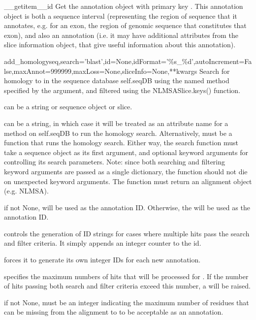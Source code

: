 \documentclass{howto}
\begin{document}
\begin{funcdesc}{__getitem__}{id}
  Get the annotation object with primary key .  This annotation object
  is both a sequence interval (representing the region of sequence that it
  annotates, e.g. for an exon, the region of genomic sequence that constitutes
  that exon), and also an annotation (i.e. it may have additional attributes
  from the slice information object, that give useful information about this
  annotation).
\end{funcdesc}

\begin{funcdesc}{add_homology}{seq,search='blast',id=None,idFormat='\%s_\%d',autoIncrement=False,maxAnnot=999999,maxLoss=None,sliceInfo=None,**kwargs}
  Search for homology to  in the sequence database self.seqDB
  using the named method specified by the  argument,
  and filtered using the NLMSASlice.keys() function.  

   can be a string or sequence object or slice.

   can be a string, in which case it will be treated as an
  attribute name for a method on self.seqDB to run the homology search.
  Alternatively,  must be a function that runs the homology search.
  Either way, the search function must take a sequence object as its
  first argument, and optional keyword arguments for controlling its
  search parameters.  Note: since both searching and filtering keyword
  arguments are passed as a single dictionary, the function should not
  die on unexpected keyword arguments.  The function must return an
  alignment object (e.g. NLMSA).

   if not None, will be used as the annotation ID.  Otherwise,
  the  will be used as the annotation ID.

   controls the generation of ID strings for cases where
  multiple hits pass the search and filter criteria.  It simply appends
  an integer counter to the id.

   forces it to generate its own integer IDs for
  each new annotation.

   specifies the maximum numbers of hits that will be
  processed for .  If the number of hits passing both search
  and filter criteria exceed this number, a  will be raised.

   if not None, must be an integer indicating the maximum
  number of residues that can be missing from the alignment to 
  to be acceptable as an annotation.


\end{funcdesc}
\end{document}
